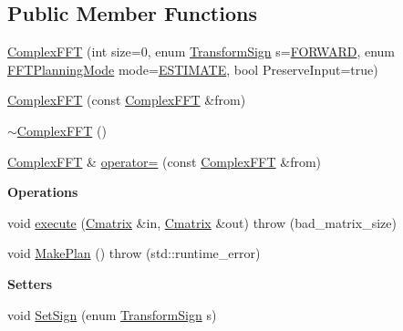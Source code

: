 \subsection*{Public Member Functions}
\begin{DoxyCompactItemize}
\item 
\hyperlink{classtsa_1_1_complex_f_f_t_af51dac1a455d6e943de87f1b0cf4d3d7}{Complex\+F\+FT} (int size=0, enum \hyperlink{classtsa_1_1_complex_f_f_t_a4e90a372fa0610f957f2c683335aa766}{Transform\+Sign} s=\hyperlink{classtsa_1_1_complex_f_f_t_a4e90a372fa0610f957f2c683335aa766a907b249808a0c1affb86572baa34510f}{F\+O\+R\+W\+A\+RD}, enum \hyperlink{namespacetsa_a217e07ef78939f88b22c8428ac96b1ae}{F\+F\+T\+Planning\+Mode} mode=\hyperlink{namespacetsa_a217e07ef78939f88b22c8428ac96b1aea2762be66fb6f3e4772c7f4cc162b9750}{E\+S\+T\+I\+M\+A\+TE}, bool Preserve\+Input=true)
\item 
\hyperlink{classtsa_1_1_complex_f_f_t_a917ecfc43a0499d90abee599755625d7}{Complex\+F\+FT} (const \hyperlink{classtsa_1_1_complex_f_f_t}{Complex\+F\+FT} \&from)
\item 
\hyperlink{classtsa_1_1_complex_f_f_t_a80004962963b35cad0fb581040a47c0d}{$\sim$\+Complex\+F\+FT} ()
\item 
\hyperlink{classtsa_1_1_complex_f_f_t}{Complex\+F\+FT} \& \hyperlink{classtsa_1_1_complex_f_f_t_ae644ce76d2adce323c4244f65735d987}{operator=} (const \hyperlink{classtsa_1_1_complex_f_f_t}{Complex\+F\+FT} \&from)
\end{DoxyCompactItemize}
\begin{Indent}\textbf{ Operations}\par
\begin{DoxyCompactItemize}
\item 
void \hyperlink{classtsa_1_1_complex_f_f_t_ada17028929521c35d3505010846a9ed5}{execute} (\hyperlink{namespacetsa_a86348fef1603a135fe5fba9e5f5486ee}{Cmatrix} \&in, \hyperlink{namespacetsa_a86348fef1603a135fe5fba9e5f5486ee}{Cmatrix} \&out)  throw (bad\+\_\+matrix\+\_\+size)
\item 
void \hyperlink{classtsa_1_1_complex_f_f_t_a05acda3ab3fbb2ead70421e587cdd210}{Make\+Plan} ()  throw (std\+::runtime\+\_\+error)
\end{DoxyCompactItemize}
\end{Indent}
\begin{Indent}\textbf{ Setters}\par
\begin{DoxyCompactItemize}
\item 
void \hyperlink{classtsa_1_1_complex_f_f_t_a3096e3de532f9433415426697f5002c2}{Set\+Sign} (enum \hyperlink{classtsa_1_1_complex_f_f_t_a4e90a372fa0610f957f2c683335aa766}{Transform\+Sign} s)
\end{DoxyCompactItemize}
\end{Indent}
